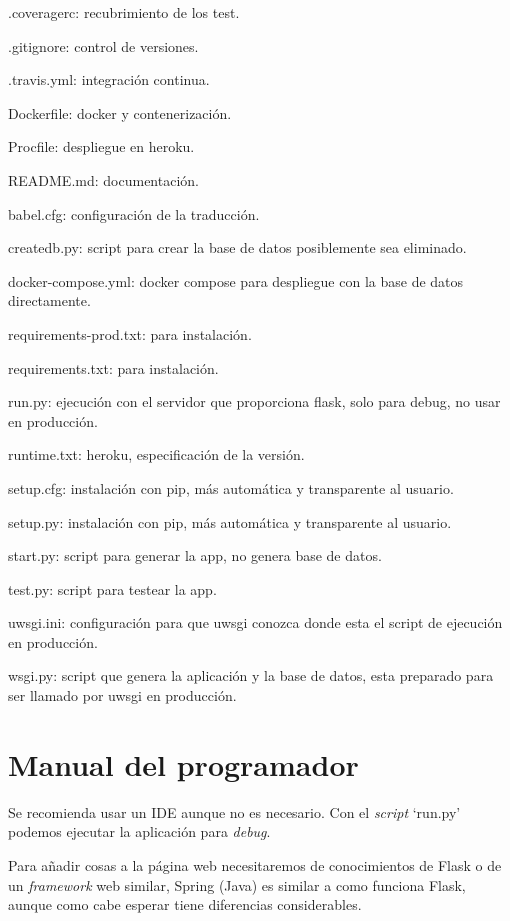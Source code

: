 \begin{list}{*}{}
\item .coveragerc: recubrimiento de los test.
\item .gitignore: control de versiones.
\item .travis.yml: integración continua.
\item Dockerfile: docker y contenerización.
\item Procfile: despliegue en heroku.
\item README.md: documentación.
\item babel.cfg: configuración de la traducción.
\item create\textunderscore db.py: script para crear la base de datos posiblemente sea eliminado.
\item docker-compose.yml: docker compose para despliegue con la base de datos directamente.
\item requirements-prod.txt: para instalación.
\item requirements.txt: para instalación.
\item run.py: ejecución con el servidor que proporciona flask, solo para debug, no usar en producción.
\item runtime.txt: heroku, especificación de la versión.
\item setup.cfg: instalación con pip, más automática y transparente al usuario. 
\item setup.py: instalación con pip, más automática y transparente al usuario. 
\item start.py: script para generar la app, no genera base de datos.
\item test.py: script para testear la app. 
\item uwsgi.ini: configuración para que uwsgi conozca donde esta el script de ejecución en producción.
\item wsgi.py: script que genera la aplicación y la base de datos, esta preparado para ser llamado por uwsgi en producción.
\end{list} 

\section{Manual del programador}

Se recomienda usar un IDE aunque no es necesario. Con el \emph{script} `run.py' podemos ejecutar la aplicación para \emph{debug}. 

Para añadir cosas a la página web necesitaremos de conocimientos de Flask o de un \emph{framework} web similar, Spring (Java) es similar a como funciona Flask, aunque como cabe esperar tiene diferencias considerables.

